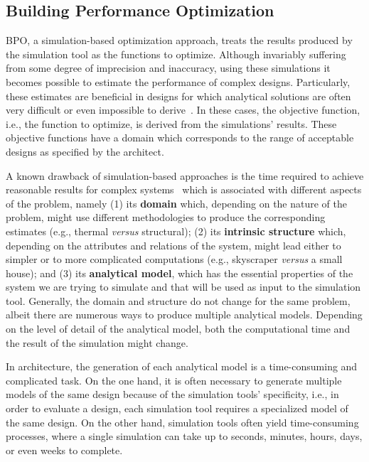 \subsection{Building Performance Optimization}

	\ac{BPO}, a simulation-based optimization approach, treats the results produced by the simulation tool as the functions to optimize. Although invariably suffering from some degree of imprecision and inaccuracy, using these simulations it becomes possible to estimate the performance of complex designs. Particularly, these estimates are beneficial in designs for which analytical solutions are often very difficult or even impossible to derive~\cite{Kolda2003}. In these cases, the objective function, i.e., the function to optimize, is derived from the simulations' results. These objective functions have a domain which corresponds to the range of acceptable designs as specified by the architect.

	A known drawback of simulation-based approaches is the time required to achieve reasonable results for complex systems~\cite{Law1991} which is associated with different aspects of the problem, namely (1) its \textbf{domain} which, depending on the nature of the problem, might use different methodologies to produce the corresponding estimates (e.g., thermal \textit{versus} structural); (2) its \textbf{intrinsic structure} which, depending on the attributes and relations of the system, might lead either to simpler or to more complicated computations (e.g., skyscraper \textit{versus} a small house); and (3) its \textbf{analytical model}, which has the essential properties of the system we are trying to simulate and that will be used as input to the simulation tool. Generally, the domain and structure do not change for the same problem, albeit there are numerous ways to produce multiple analytical models. Depending on the level of detail of the analytical model, both the computational time and the result of the simulation might change. 

	In architecture, the generation of each analytical model is a time-consuming and complicated task. On the one hand, it is often necessary to generate multiple models of the same design because of the simulation tools' specificity, i.e., in order to evaluate a design, each simulation tool requires a specialized model of the same design. On the other hand, simulation tools often yield time-consuming processes, where a single simulation can take up to seconds, minutes, hours, days, or even weeks to complete. 
	
